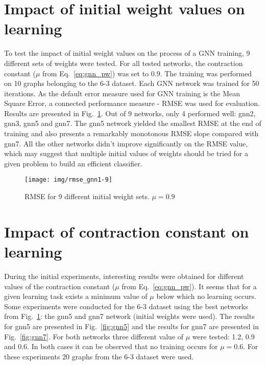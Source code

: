 \section{Impact of initial weight values on learning}
To test the impact of initial weight values on the process of a GNN training, 9 different sets of weights were tested. For all tested networks, the contraction constant ($\mu$ from Eq.~\ref{eq:gnn_pw}) was set to $0.9$. The training was performed on 10 graphs belonging to the 6-3 dataset. Each GNN network was trained for 50 iterations. As the default error measure used for GNN training is the Mean Square Error, a connected performance measure - RMSE was used for evaluation. Results are presented in Fig.~\ref{fig:gnn_multiple}. Out of 9 networks, only 4 performed well: gnn2, gnn3, gnn5 and gnn7. The gnn5 network yielded the smallest RMSE at the end of training and also presents a remarkably monotonous RMSE slope compared with gnn7. All the other networks didn't improve significantly on the RMSE value, which may suggest that multiple initial values of weights should be tried for a given problem to build an efficient classifier.

\begin{figure}[h!]
\begin{center}
	\texttt{[image: img/rmse\_gnn1-9]}
	\caption{RMSE for 9 different initial weight sets. $\mu = 0.9$}
	\label{fig:gnn_multiple}
\end{center}
\end{figure}

\newpage
\section{Impact of contraction constant on learning}
During the initial experiments, interesting results were obtained for different values of the contraction constant ($\mu$ from Eq.~\ref{eq:gnn_pw}). It seems that for a given learning task exists a minimum value of $\mu$ below which no learning occurs. Some experiments were conducted for the 6-3 dataset using the best networks from Fig.~\ref{fig:gnn_multiple}: the gnn5 and gnn7 network (initial weights were used). The results for gnn5 are presented in Fig.~\ref{fig:gnn5} and the results for gnn7 are presented in Fig.~\ref{fig:gnn7}. For both networks three different value of $\mu$ were tested: 1.2, 0.9 and 0.6. In both cases it can be observed that no training occurs for $\mu = 0.6$. For these experiments 20 graphs from the 6-3 dataset were used.

